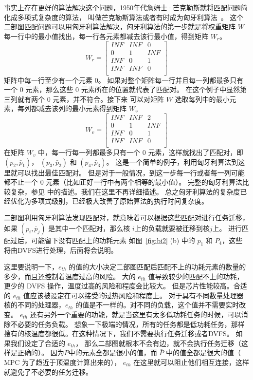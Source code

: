  事实上存在更好的算法解决这个问题，1950年代詹姆士·芒克勒斯就将匹配问题简化成多项式复杂度的算法，
 叫做芒克勒斯算法或者有时成为匈牙利算法~。
 这个二部图匹配问题可以用匈牙利算法解决，匈牙利算法的第一步就是将权重矩阵 $W$ 每一行中的最小值找出，每一行各元素都减去该行最小值，得到矩阵 $W_r$。
 \begin{equation}
W_r= 
\left[
\begin{array}{ccc}
INF & INF & 0   \\
0   &  1  & INF  \\
INF &  0  & 1   \\
INF & INF & 0    \\
\end{array}
\right]
\end{equation}
矩阵中每一行至少有一个元素 $0$。 如果对整个矩阵每一行并且每一列都最多只有一个 $0$ 元素，那么这些 $0$ 元素所在的位置就代表了匹配对。
在这个例子中显然第三列就有两个 $0$ 元素，并不符合。接下来 可以对矩阵 $W$ 选取每列中的最小元素，每列都减去该列的最小元素得到矩阵 $W_v$
 \begin{equation}
W_v= 
\left[
\begin{array}{ccc}
INF & INF & 2   \\
0   &  1  & INF  \\
INF &  0  & 1   \\
INF & INF & 0    \\
\end{array}
\right]
\end{equation}
在矩阵 $W_v$ 中，每一行每一列都最多只有一个 $0$ 元素，这样就找出了匹配对，即 $(p_2, \bar{p}_1)$， $(p_3, \bar{p}_2)$ 和 $(p_4, \bar{p}_3)$。
这是一个简单的例子，利用匈牙利算法到这里就可以找出最佳匹配对。
但是对于一般情况，到这一步每一行或者每一列可能都不止一个 $0$ 元素（比如正好一行中有两个相等的最小值）。
完整的匈牙利算法比较复杂，参见 \cite{munkres1957algorithms} 中的描述。我们在这里不再详细描述。
总之匈牙利算法的复杂度已经优化为多项式级别，已经极大改善了原始算法的执行时间复杂度。
 
 二部图利用匈牙利算法发现匹配对，就意味着可以根据这些匹配对进行任务迁移，如果 $(p_i, \bar{p}_j)$ 是其中一个匹配对，那么核 $i$上的负载就要被迁移到核$j$上。
 进行匹配过后，可能留下没有匹配上的功耗元素 如图~\ref{fig:bi2} (b) 中的 $p_1$ 和 $\bar{P}_4$，这些将由DVFS进行处理，后面将会说明。
 
 这里要说明一下，$e_{th}$ 的值的大小决定二部图匹配后匹配不上的功耗元素的数量的多少，而且还控制着温度过高的风险。
 大的 $e_{th}$ 值导致较少的匹配不上的功耗，更少的 DVFS 操作，温度过高的风险和程度会比较大。
 但是芯片性能较高。合适的 $e_{th}$ 值应该被设定在可以接受的过热风险和程度上。 
 对于具有不同数量处理器核的不同的处理器，$e_{th}$ 的值是不一样的。对不同的负载，这个值并不需要实时改变。
 $e_{th}$ 还有另外一个重要的功能，就是当这里有太多低功耗任务的时候，可以消除不必要的任务负载。
 想象一下极端的情况，所有的任务都是低功耗任务，那样搜有的核温度都很低。在这种情况下，我们不需要执行任务迁移或者DVFS。
 如果我们设定了合适的 $e_{th}$， 那么二部图就根本不会有边，就不会执行任务迁移（这样是正确的）。
 因为$P$中的元素全都是很小的值，而 $\bar{P}$ 中的值全都是很大的值（ MPC 为了趋近于顶温度计算出来的），
 $e_{th}$ 在这里就可以阻止他们相互连接，这样就避免了不必要的任务迁移。
 
